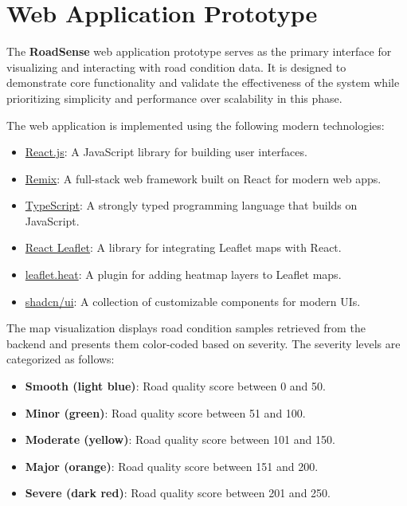 \section{Web Application Prototype}

The \textbf{RoadSense} web application prototype serves as the primary interface for visualizing and interacting with road condition data. It is designed to demonstrate core functionality and validate the effectiveness of the system while prioritizing simplicity and performance over scalability in this phase.

The web application is implemented using the following modern technologies:
\begin{itemize}
    \item \href{https://reactjs.org/}{React.js}: A JavaScript library for building user interfaces.
    \item \href{https://remix.run/}{Remix}: A full-stack web framework built on React for modern web apps.
    \item \href{https://www.typescriptlang.org/}{TypeScript}: A strongly typed programming language that builds on JavaScript.
    \item \href{https://react-leaflet.js.org/}{React Leaflet}: A library for integrating Leaflet maps with React.
    \item \href{https://github.com/Leaflet/Leaflet.heat}{leaflet.heat}: A plugin for adding heatmap layers to Leaflet maps.
    \item \href{https://ui.shadcn.dev/}{shadcn/ui}: A collection of customizable components for modern UIs.
\end{itemize}

The map visualization displays road condition samples retrieved from the backend and presents them color-coded based on severity. The severity levels are categorized as follows:
\begin{itemize}
    \item \textbf{Smooth (light blue)}: Road quality score between 0 and 50.
    \item \textbf{Minor (green)}: Road quality score between 51 and 100.
    \item \textbf{Moderate (yellow)}: Road quality score between 101 and 150.
    \item \textbf{Major (orange)}: Road quality score between 151 and 200.
    \item \textbf{Severe (dark red)}: Road quality score between 201 and 250.
\end{itemize}

